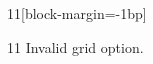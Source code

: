 \documentclass[paper=A4]{ropas-poster}
\begin{document}
\begin{postergrid}{1}{1}[block-margin=-1bp]
\begin{posterblock}{1}{1}
Invalid grid option.
\end{posterblock}
\end{postergrid}
\end{document}
